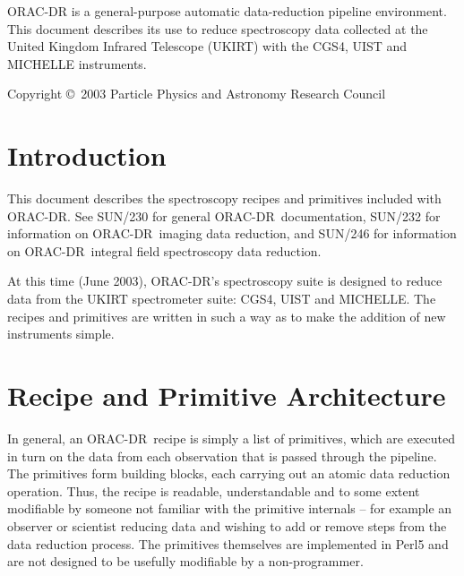 \documentclass[twoside,11pt]{article}
\newcommand{\stardocinitials}  {SUN}
\newcommand{\stardoccopyright} {Copyright \copyright\ 2003 Particle Physics and Astronomy Research Council}
\newcommand{\stardocnumber}    {236.3}
\newcommand{\stardocabstract}  {ORAC-DR is a
general-purpose automatic data-reduction pipeline environment.  This
document describes its use to reduce spectroscopy data collected at the
United Kingdom Infrared Telescope (UKIRT) with the CGS4, UIST and MICHELLE
instruments. }
\newcommand{\stardocname}{\stardocinitials /\stardocnumber}
\newenvironment{latexonly}{}{}
\newcommand{\xref}[3]{#1}
\renewcommand{\_}{\texttt{\symbol{95}}}
\newcommand{\ORACDR}{{\footnotesize ORAC-DR}}
\renewcommand{\thepage}{\roman{page}}
\begin{document}
\stardocabstract

\begin{latexonly}
\newpage
\vspace*{\fill}
\stardoccopyright
\end{latexonly}

  \newpage
  \begin{latexonly}
    \setlength{\parskip}{0mm}
    \tableofcontents
    \setlength{\parskip}{\medskipamount}
    \markboth{\stardocname}{\stardocname}
  \end{latexonly}

\cleardoublepage
\renewcommand{\thepage}{\arabic{page}}
\setcounter{page}{1}


\section{Introduction}

This document describes the spectroscopy recipes and primitives included with
\ORACDR. See \xref{SUN/230}{sun230}{} for general \ORACDR\ documentation,
\xref{SUN/232}{sun232}{} for information on \ORACDR\ imaging data reduction,
and \xref{SUN/246}{sun246}{} for information on \ORACDR\ integral field
spectroscopy data reduction.

At this time (June 2003), \ORACDR's spectroscopy suite is designed
to reduce data from the UKIRT spectrometer suite: CGS4, UIST and
MICHELLE. The recipes and primitives
are written in such a way as to make the addition of new instruments
simple.

\section{Recipe and Primitive Architecture}

In general, an \ORACDR\ recipe is simply a list of primitives, which
are executed in turn on the data from each observation that is passed
through the pipeline. The primitives form building blocks, each
carrying out an atomic data reduction operation. Thus, the recipe is
readable, understandable and to some extent modifiable by someone not
familiar with the primitive internals -- for example an observer or
scientist reducing data and wishing to add or remove steps from the
data reduction process. The primitives themselves are implemented in
Perl5 and are not designed to be usefully modifiable by a
non-programmer.
\end{document}
